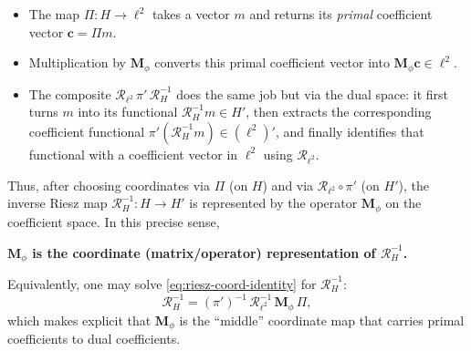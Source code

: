 \documentclass[11pt,twoside,openright]{book}
\theoremstyle{plain}
\theoremstyle{definition}
\theoremstyle{remark}
\newcommand{\Riesz}{\mathcal{R}}
\begin{document}
\begin{itemize}
\item The map $\Pi:H\to\ell^2$ takes a vector $m$ and returns its \emph{primal}
coefficient vector $\mathbf{c}=\Pi m$.

\item Multiplication by $\mathbf{M}_\phi$ converts this primal coefficient
vector into $\mathbf{M}_\phi\mathbf{c}\in\ell^2$.

\item The composite $\Riesz_{\ell^2}\,\pi'\,\Riesz_H^{-1}$ does the same job
but via the dual space: it first turns $m$ into its functional
$\Riesz_H^{-1}m\in H'$, then extracts the corresponding coefficient functional
$\pi'(\Riesz_H^{-1}m)\in(\ell^2)'$, and finally identifies that functional with
a coefficient vector in $\ell^2$ using $\Riesz_{\ell^2}$.

\end{itemize}

Thus, after choosing coordinates via $\Pi$ (on $H$) and via
$\Riesz_{\ell^2}\circ \pi'$ (on $H'$), the inverse Riesz map
$\Riesz_H^{-1}:H\to H'$ is represented by the operator $\mathbf{M}_\phi$ on the
coefficient space.  In this precise sense,

\begin{center}
\textbf{$\mathbf{M}_\phi$ is the coordinate (matrix/operator) representation of $\Riesz_H^{-1}$.}
\end{center}

Equivalently, one may solve \eqref{eq:riesz-coord-identity} for $\Riesz_H^{-1}$:
\begin{equation}
\label{eq:riesz-inv-from-gram}
\Riesz_H^{-1}
=
(\pi')^{-1}\,\Riesz_{\ell^2}^{-1}\,\mathbf{M}_\phi\,\Pi,
\end{equation}
which makes explicit that $\mathbf{M}_\phi$ is the ``middle'' coordinate map
that carries primal coefficients to dual coefficients.
\end{document}
